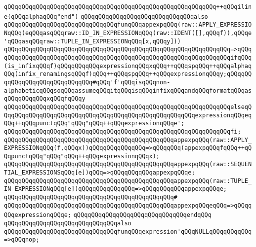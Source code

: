 \verb|qQQqqQQqqQQqqQQqqQQqqQQqqQQqqQQqqQQqqQQqqQQqqQQqqQQqqQQqqQQq++qQQqiline(qQQqalphaqQQq"end")|\newline
\newline
\verb|qQQqqQQqqQQqqQQqqQQqqQQqqQQqqQQqalso|\newline
\verb|qQQqqQQqqQQqqQQqqQQqqQQqqQQqqQQqfunqQQqappexpqQQq(raw::APPLY_EXPRESSIONqQQq(eqQQqasqQQqraw::ID_IN_EXPRESSIONqQQq(raw::IDENT([],qQQqf)),qQQqe'qQQqasqQQqraw::TUPLE_IN_EXPRESSIONqQQq[x,qQQqy]))|\newline
\verb|qQQqqQQqqQQqqQQqqQQqqQQqqQQqqQQqqQQqqQQqqQQqqQQqqQQqqQQqqQQqqQQq=>qQQq|\newline
\verb|qQQqqQQqqQQqqQQqqQQqqQQqqQQqqQQqqQQqqQQqqQQqqQQqqQQqqQQqqQQqqQQqifqQQq(is_infixqQQqf)qQQqqQQqqQQqexpressionqQQqxqQQq++qQQqspqQQq++qQQqalphaqQQq(infix_renamingsqQQqf)qQQq++qQQqspqQQq++qQQqexpressionqQQqy;qQQqqQQqqQQqqQQqqQQqqQQqqQQqqQQq#qQQq'f'qQQqisqQQqnon-alphabeticqQQqsoqQQqassumeqQQqitqQQqisqQQqinfixqQQqandqQQqformatqQQqasqQQqqQQqqQQqxqQQqfqQQqy|\newline
\verb|qQQqqQQqqQQqqQQqqQQqqQQqqQQqqQQqqQQqqQQqqQQqqQQqqQQqqQQqqQQqqQQqelseqQQqqQQqqQQqqQQqqQQqqQQqqQQqqQQqqQQqqQQqqQQqqQQqqQQqqQQqexpressionqQQqeqQQq++qQQqpunctqQQq"qQQq"qQQq++qQQqexpressionqQQqe';|\newline
\verb|qQQqqQQqqQQqqQQqqQQqqQQqqQQqqQQqqQQqqQQqqQQqqQQqqQQqqQQqqQQqqQQqfi;|\newline
\newline
\verb|qQQqqQQqqQQqqQQqqQQqqQQqqQQqqQQqqQQqqQQqqQQqqQQqappexpqQQq(raw::APPLY_EXPRESSIONqQQq(f,qQQqx))qQQqqQQqqQQqqQQq=>qQQqqQQq(appexpqQQqfqQQq++qQQqpunctqQQq"qQQq"qQQq++qQQqexpressionqQQqx);|\newline
\verb|qQQqqQQqqQQqqQQqqQQqqQQqqQQqqQQqqQQqqQQqqQQqqQQqappexpqQQq(raw::SEQUENTIAL_EXPRESSIONSqQQq[e])qQQq=>qQQqqQQqqQQqappexpqQQqe;|\newline
\verb|qQQqqQQqqQQqqQQqqQQqqQQqqQQqqQQqqQQqqQQqqQQqqQQqappexpqQQq(raw::TUPLE_IN_EXPRESSIONqQQq[e])qQQqqQQqqQQqqQQq=>qQQqqQQqqQQqappexpqQQqe;|\newline
\verb|qQQqqQQqqQQqqQQqqQQqqQQqqQQqqQQqqQQqqQQqqQQqqQQq#|\newline
\verb|qQQqqQQqqQQqqQQqqQQqqQQqqQQqqQQqqQQqqQQqqQQqqQQqappexpqQQqeqQQq=>qQQqqQQqexpressionqQQqe;|\newline
\verb|qQQqqQQqqQQqqQQqqQQqqQQqqQQqqQQqendqQQq|\newline
\newline
\verb|qQQqqQQqqQQqqQQqqQQqqQQqqQQqqQQqalso|\newline
\verb|qQQqqQQqqQQqqQQqqQQqqQQqqQQqqQQqfunqQQqexpression'qQQqNULLqQQqqQQqqQQq=>qQQqnop;|\newline
